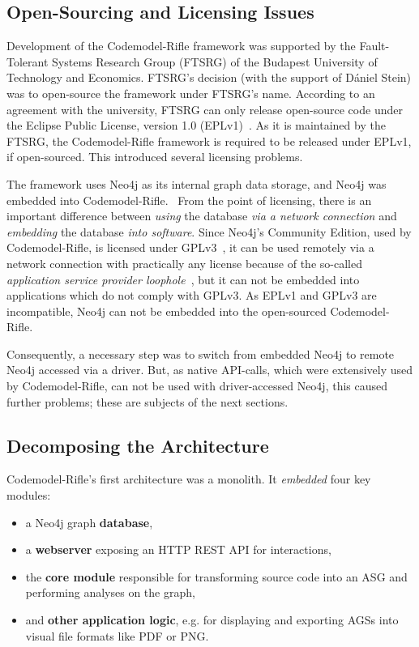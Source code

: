 \subsection{Open-Sourcing and Licensing Issues}

Development of the Codemodel-Rifle framework was supported by the Fault-Tolerant Systems Research Group (FTSRG) of the Budapest University of Technology and Economics. FTSRG's decision (with the support of Dániel Stein) was to open-source the framework under FTSRG's name. According to an agreement with the university, FTSRG can only release open-source code under the Eclipse Public License, version 1.0 (EPLv1)~\cite{eplv1}. As it is maintained by the FTSRG, the Codemodel-Rifle framework is required to be released under EPLv1, if open-sourced. This introduced several licensing problems.~\cite{codemodel-rifle-licensing}

The framework uses Neo4j as its internal graph data storage, and Neo4j was embedded into Codemodel-Rifle.~\cite{stein-daniel-msc} From the point of licensing, there is an important difference between \emph{using} the database \emph{via a network connection} and \emph{embedding} the database \emph{into software}. Since Neo4j's Community Edition, used by Codemodel-Rifle, is licensed under GPLv3~\cite{neo4j-licensing}, it can be used remotely via a network connection with practically any license because of the so-called \emph{application service provider loophole}~\cite{asp-loophole}, but it can not be embedded into applications which do not comply with GPLv3. As EPLv1 and GPLv3 are incompatible, Neo4j can not be embedded into the open-sourced Codemodel-Rifle.

Consequently, a necessary step was to switch from embedded Neo4j to remote Neo4j accessed via a driver. But, as native API-calls, which were extensively used by Codemodel-Rifle, can not be used with driver-accessed Neo4j, this caused further problems; these are subjects of the next sections.


\subsection{Decomposing the Architecture}

Codemodel-Rifle's first architecture was a monolith. It \emph{embedded} four key modules:

\begin{itemize}
\item a Neo4j graph \textbf{database},
\item a \textbf{webserver} exposing an HTTP REST API for interactions,
\item the \textbf{core module} responsible for transforming source code into an ASG and performing analyses on the graph,
\item and \textbf{other application logic}, e.g. for displaying and exporting AGSs into visual file formats like PDF or PNG.
\end{itemize}

